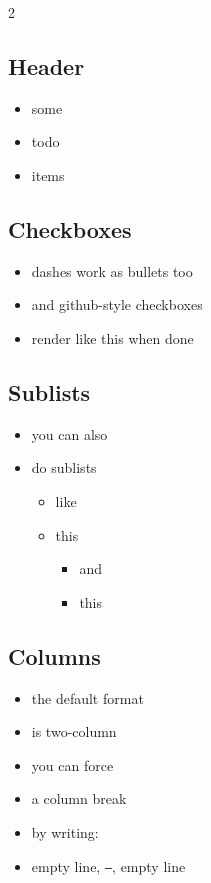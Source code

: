 \documentclass[11pt,letterpaper]{article}
\begin{document}
\begin{multicols*}{2}

\subsection*{Header}
\begin{itemize}
    \item some
    \item todo
    \item items
\end{itemize}

\subsection*{Checkboxes}
\begin{itemize}
    
    \item dashes work as bullets too
    
    \item and github-style checkboxes
    
    \item[{$\boxtimes$}] render like this when done
\end{itemize}

\subsection*{Sublists}
\begin{itemize}
    \item you can also
    \item do sublists
    \begin{itemize}
        \item like
        \item this
        \begin{itemize}
            \item and
            \item this
        \end{itemize}
    \end{itemize}
\end{itemize}

\subsection*{Columns}
\begin{itemize}
    \item the default format
    \item is two-column
    \item you can force
    \item a column break
    \item by writing:
    \item empty line, \texttt{---}, empty line
\end{itemize}


\end{multicols*}
\end{document}
